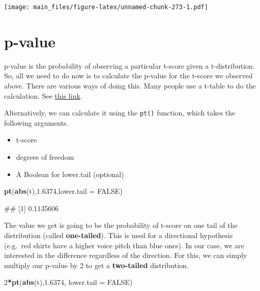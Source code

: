 \documentclass[
]{book}
\newenvironment{Shaded}{\begin{snugshade}}{\end{snugshade}}
\newcommand{\AttributeTok}[1]{\textcolor[rgb]{0.13,0.29,0.53}{#1}}
\newcommand{\ConstantTok}[1]{\textcolor[rgb]{0.56,0.35,0.01}{#1}}
\newcommand{\DecValTok}[1]{\textcolor[rgb]{0.00,0.00,0.81}{#1}}
\newcommand{\FloatTok}[1]{\textcolor[rgb]{0.00,0.00,0.81}{#1}}
\newcommand{\FunctionTok}[1]{\textcolor[rgb]{0.13,0.29,0.53}{\textbf{#1}}}
\newcommand{\NormalTok}[1]{#1}
\newcommand{\SpecialCharTok}[1]{\textcolor[rgb]{0.81,0.36,0.00}{\textbf{#1}}}
\providecommand{\tightlist}{%
  \setlength{\itemsep}{0pt}\setlength{\parskip}{0pt}}
\begin{document}
\texttt{[image: main\_files/figure-latex/unnamed-chunk-273-1.pdf]}

\section{p-value}\label{p-value}

p-value is the probability of observing a particular t-score given a t-distribution. So, all we need to do now is to calculate the p-value for the t-score we observed above. There are various ways of doing this. Many people use a t-table to do the calculation. See \href{https://www.sjsu.edu/faculty/gerstman/StatPrimer/t-table.pdf}{this link}.

Alternatively, we can calculate it using the \texttt{pt()} function, which takes the following arguments.

\begin{itemize}
\tightlist
\item
  t-score
\item
  degrees of freedom
\item
  A Boolean for lower.tail (optional)
\end{itemize}

\begin{Shaded}
\begin{Highlighting}[]
\FunctionTok{pt}\NormalTok{(}\FunctionTok{abs}\NormalTok{(t),}\FloatTok{1.6374}\NormalTok{,}\AttributeTok{lower.tail =} \ConstantTok{FALSE}\NormalTok{)}
\end{Highlighting}
\end{Shaded}

\begin{Shaded}
\begin{Highlighting}[]
\NormalTok{\#\# [1] 0.1135606}
\end{Highlighting}
\end{Shaded}

The value we get is going to be the probability of t-score on one tail of the distribution (called \textbf{one-tailed}). This is used for a directional hypothesis (e.g.~red shirts have a higher voice pitch than blue ones). In our case, we are interested in the difference regardless of the direction. For this, we can simply multiply our p-value by 2 to get a \textbf{two-tailed} distribution.

\begin{Shaded}
\begin{Highlighting}[]
\DecValTok{2}\SpecialCharTok{*}\FunctionTok{pt}\NormalTok{(}\FunctionTok{abs}\NormalTok{(t),}\FloatTok{1.6374}\NormalTok{, }\AttributeTok{lower.tail =} \ConstantTok{FALSE}\NormalTok{)}
\end{Highlighting}
\end{Shaded}
\end{document}
